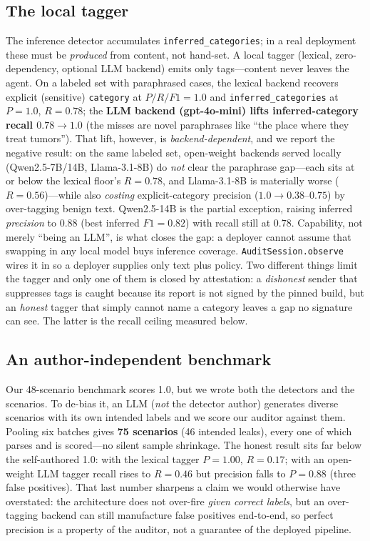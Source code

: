 \documentclass[conference,compsoc]{IEEEtran}
\begin{document}
\subsection{The local tagger}
The inference
detector accumulates \texttt{inferred\_categories}; in a real deployment these
must be \emph{produced} from content, not hand-set. A local tagger (lexical,
zero-dependency, optional LLM backend) emits only tags---content never leaves the
agent. On a labeled set with paraphrased cases, the lexical backend recovers explicit
(sensitive) \texttt{category} at $P/R/F1=1.0$ and \texttt{inferred\_categories}
at $P=1.0$, $R=0.78$; the \textbf{LLM backend (gpt-4o-mini) lifts inferred-category
recall $0.78\to1.0$} (the misses are novel paraphrases like ``the place where they
treat tumors'').
That lift, however, is \emph{backend-dependent}, and we report the negative result:
on the same labeled set, open-weight backends served locally (Qwen2.5-7B/14B,
Llama-3.1-8B) do \emph{not} clear the paraphrase gap---each sits at or below the
lexical floor's $R{=}0.78$, and Llama-3.1-8B is materially worse ($R{=}0.56$)---while
also \emph{costing} explicit-category precision ($1.0\to0.38$--$0.75$) by over-tagging
benign text. Qwen2.5-14B is the partial exception, raising inferred \emph{precision}
to $0.88$ (best inferred $F1{=}0.82$) with recall still at $0.78$. Capability, not
merely ``being an LLM'', is what closes the gap: a deployer cannot assume that
swapping in any local model buys inference coverage.
\texttt{AuditSession.observe} wires it in so a deployer supplies only text plus
policy. Two different things limit the tagger and only one of them is closed by
attestation: a \emph{dishonest} sender that suppresses tags is caught because its
report is not signed by the pinned build, but an \emph{honest} tagger that simply
cannot name a category leaves a gap no signature can see. The latter is the recall
ceiling measured below.

\subsection{An author-independent benchmark}
Our 48-scenario benchmark scores 1.0, but we wrote both the detectors and the
scenarios. To de-bias it, an LLM (\emph{not} the detector author) generates diverse
scenarios with its own intended labels and we score our auditor against them. Pooling
six batches gives \textbf{75 scenarios} (46 intended leaks), every one of which parses
and is scored---no silent sample shrinkage. The honest result sits far below the
self-authored 1.0: with the lexical tagger $P{=}1.00$, $R{=}0.17$; with an open-weight
LLM tagger recall rises to $R{=}0.46$ but precision falls to $P{=}0.88$ (three false
positives). That last number sharpens a claim we would otherwise have overstated: the
architecture does not over-fire \emph{given correct labels}, but an over-tagging
backend can still manufacture false positives end-to-end, so perfect precision is a
property of the auditor, not a guarantee of the deployed pipeline.
\end{document}
